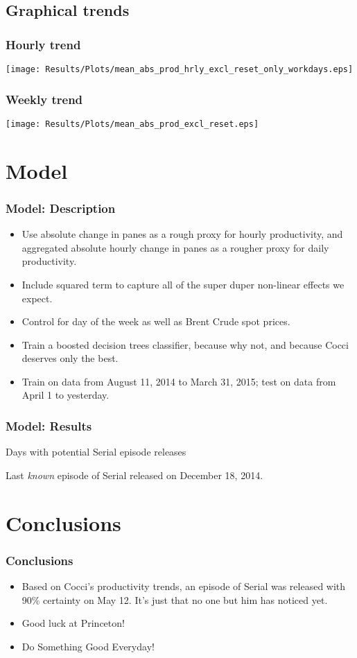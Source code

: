 \documentclass{beamer}
\begin{document}
\subsection{Graphical trends}
\frame
{
  \frametitle{Hourly trend}
  
  \begin{center}
  \texttt{[image: Results/Plots/mean\_abs\_prod\_hrly\_excl\_reset\_only\_workdays.eps]}
  \end{center}
}

\frame
{
  \frametitle{Weekly trend}
  
  \begin{center}
  \texttt{[image: Results/Plots/mean\_abs\_prod\_excl\_reset.eps]}
  \end{center}
}

\section{Model}
\frame
{
\frametitle{Model: Description}
\begin{itemize}
\item<1-> Use absolute change in panes as a rough proxy for hourly productivity, and aggregated absolute hourly change in panes as a rougher proxy for daily productivity.
\item<2-> Include squared term to capture all of the super duper non-linear effects we expect.
\item<3-> Control for day of the week as well as Brent Crude spot prices.
\item<3-> Train a boosted decision trees classifier, because why not, and because Cocci deserves only the best.
\item<4-> Train on data from August 11, 2014 to March 31, 2015; test on data from April 1 to yesterday.
\end{itemize}
}

\frame
{
\frametitle{Model: Results}
\begin{table}[htbp]
\caption{Days with potential Serial episode releases}

\begin{tablenotes}
\begin{footnotesize}
\item Last \textit{known} episode of Serial released on December 18, 2014.
\end{footnotesize}
\end{tablenotes}
\end{table}

}

\section{Conclusions}
\frame
{
\frametitle{Conclusions}
\begin{itemize}
\item<1-> Based on Cocci's productivity trends, an episode of Serial was released with 90\% certainty on May 12. It's just that no one but him has noticed yet.
\item<2-> Good luck at Princeton!
\item<3-> Do Something Good Everyday!
\end{itemize}
}
\end{document}
